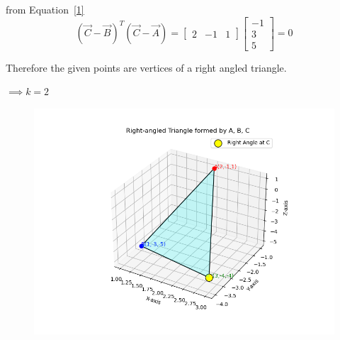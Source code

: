 \documentclass[journal]{IEEEtran}
\begin{document}
from Equation~\eqref{1}
\begin{equation}
(\vec{C}-\vec{B})^{T} (\vec{C}-\vec{A}) = \begin{bmatrix}
2 &-1  & 1
\end{bmatrix}\begin{bmatrix}
-1 \\ 
3 \\ 
5
\end{bmatrix}=0
\end{equation}

Therefore the given points are vertices of a right angled triangle.
\begin{center}
$\implies k = 2$
\end{center}
\begin{figure}[H]
\begin{center}
\includegraphics[width=0.6\columnwidth]{Figs/Fig1.png}
\end{center}
\caption{}
\label{fig:Fig.1}
\end{figure}
\end{document}
